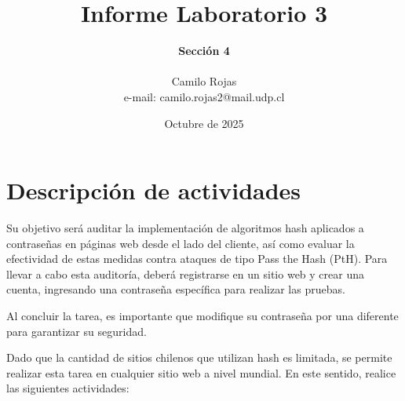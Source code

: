 \documentclass[letter,12pt]{article}
\begin{document}
%
   \title{\Huge{Informe Laboratorio 3}}

   \author{\textbf{Sección 4} \\  \\Camilo Rojas \\ e-mail: camilo.rojas2@mail.udp.cl}
          
   \date{Octubre de 2025}

   \maketitle
   
   \tableofcontents
 
  \newpage
  

\section{Descripción de actividades}
Su objetivo será auditar la implementación de algoritmos hash aplicados a contraseñas en páginas web desde el lado del cliente, así como evaluar la efectividad de estas medidas contra ataques de tipo Pass the Hash (PtH). Para llevar a cabo esta auditoría, deberá registrarse en un sitio web y crear una cuenta, ingresando una contraseña específica para realizar las pruebas.\par

Al concluir la tarea, es importante que modifique su contraseña por una diferente para garantizar su seguridad.\par

Dado que la cantidad de sitios chilenos que utilizan hash es limitada, se permite realizar esta tarea en cualquier sitio web a nivel mundial. En este sentido, realice las siguientes actividades:
\end{document}

